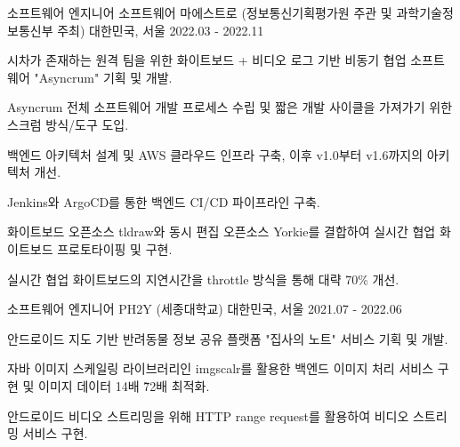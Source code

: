 \begin{cventries}
  \cventry
    {소프트웨어 엔지니어} %
    {소프트웨어 마에스트로 (정보통신기획평가원 주관 및 과학기술정보통신부 주최)} %
    {대한민국, 서울} %
    {2022.03 - 2022.11} %
    {
      \begin{cvitems} %
        \item {시차가 존재하는 원격 팀을 위한 화이트보드 + 비디오 로그 기반 비동기 협업 소프트웨어 "Asyncrum" 기획 및 개발.}
        \item {Asyncrum 전체 소프트웨어 개발 프로세스 수립 및 짧은 개발 사이클을 가져가기 위한 스크럼 방식/도구 도입}.
        \item {백엔드 아키텍처 설계 및 AWS 클라우드 인프라 구축, 이후 v1.0부터 v1.6까지의 아키텍처 개선.}
        \item {Jenkins와 ArgoCD를 통한 백엔드 CI/CD 파이프라인 구축.}
        \item {화이트보드 오픈소스 tldraw와 동시 편집 오픈소스 Yorkie를 결합하여 실시간 협업 화이트보드 프로토타이핑 및 구현.}     
        \item {실시간 협업 화이트보드의 지연시간을 throttle 방식을 통해 대략 70\% 개선.}    
      \end{cvitems}
    }

  \cventry
    {소프트웨어 엔지니어} %
    {PH2Y (세종대학교)} %
    {대한민국, 서울} %
    {2021.07 - 2022.06} %
    {
      \begin{cvitems} %
        \item {안드로이드 지도 기반 반려동물 정보 공유 플랫폼 "집사의 노트" 서비스 기획 및 개발.}
        \item {자바 이미지 스케일링 라이브러리인 imgscalr를 활용한 백엔드 이미지 처리 서비스 구현 및 이미지 데이터 14배 \~ 72배 최적화.}
        \item {안드로이드 비디오 스트리밍을 위해 HTTP range request를 활용하여 비디오 스트리밍 서비스 구현.}
      \end{cvitems}
    }


\end{cventries}
